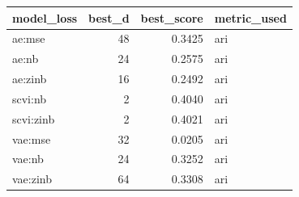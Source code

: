\begin{tabular}{lrrl}
\toprule
model\_loss & best\_d & best\_score & metric\_used \\
\midrule
ae:mse & 48 & 0.3425 & ari \\
ae:nb & 24 & 0.2575 & ari \\
ae:zinb & 16 & 0.2492 & ari \\
scvi:nb & 2 & 0.4040 & ari \\
scvi:zinb & 2 & 0.4021 & ari \\
vae:mse & 32 & 0.0205 & ari \\
vae:nb & 24 & 0.3252 & ari \\
vae:zinb & 64 & 0.3308 & ari \\
\bottomrule
\end{tabular}
